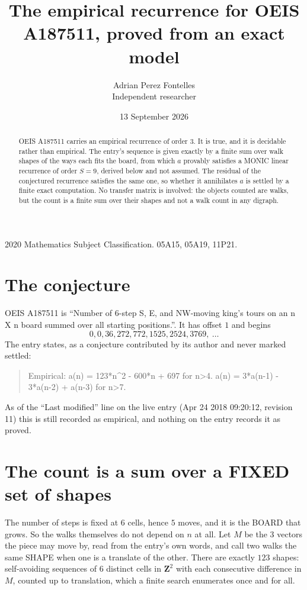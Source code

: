 \documentclass[11pt,a4paper]{article}
\title{The empirical recurrence for OEIS A187511, proved from an exact model}
\author{Adrian Perez Fontelles\\ \small Independent researcher}
\date{13 September 2026}
\theoremstyle{plain}
\theoremstyle{definition}
\begin{document}
\maketitle

\begin{abstract}
OEIS A187511 carries an empirical recurrence of order $3$. It is true, and it is
decidable rather than empirical. The entry's sequence is given exactly by a finite sum over walk shapes of the ways each fits the board, from
which $a$ provably satisfies a MONIC linear recurrence of order $S=9$, derived below and not
assumed. The residual of the conjectured recurrence satisfies the same one, so whether it
annihilates $a$ is settled by a finite exact computation. No transfer matrix is involved: the objects counted are walks, but the count is a finite sum over their shapes and not a walk count in any digraph.
\end{abstract}

\noindent\small 2020 Mathematics Subject Classification. 05A15, 05A19, 11P21.\normalsize

\section{The conjecture}

OEIS A187511 is ``Number of 6-step S, E, and NW-moving king's tours on an n X n board summed over all starting positions.''. It has offset $1$ and begins
\[
0, 0, 36, 272, 772, 1525, 2524, 3769,\ \dots
\]
The entry states, as a conjecture contributed by its author and never marked settled:
\begin{quote}
Empirical: a(n) = 123*n\^{}2 - 600*n + 697 for n>4. a(n) = 3*a(n-1) - 3*a(n-2) + a(n-3) for n>7.
\end{quote}
As of the ``Last modified'' line on the live entry (Apr 24 2018 09:20:12, revision 11)
this is still recorded as empirical, and nothing on the entry records it as proved.

\section{The count is a sum over a FIXED set of shapes}

The number of steps is fixed at $6$ cells, hence $5$ moves, and it is the BOARD
that grows. So the walks themselves do not depend on $n$ at all. Let $M$ be the $3$
vectors the piece may move by, read from the entry's own words, and call two walks the same
SHAPE when one is a translate of the other. There are exactly $123$ shapes: self-avoiding
sequences of $6$ distinct cells in $\mathbf{Z}^{2}$ with each consecutive difference in
$M$, counted up to translation, which a finite search enumerates once and for all.
\end{document}
